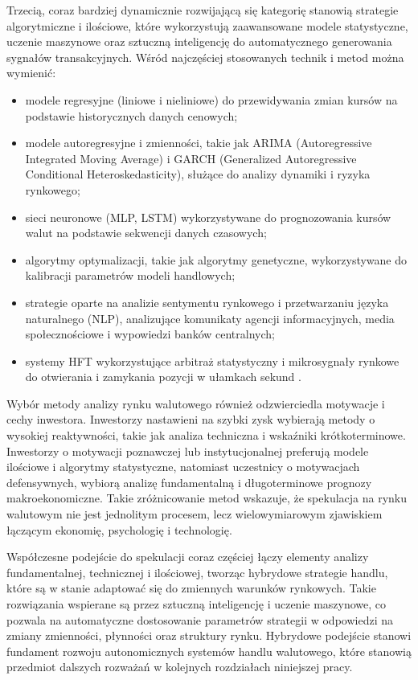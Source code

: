 Trzecią, coraz bardziej dynamicznie rozwijającą się kategorię stanowią strategie algorytmiczne i ilościowe, które wykorzystują zaawansowane modele statystyczne, uczenie maszynowe oraz sztuczną inteligencję do automatycznego generowania sygnałów transakcyjnych. Wśród najczęściej stosowanych technik i metod można wymienić:
\begin{itemize}
    \item modele regresyjne (liniowe i nieliniowe) do przewidywania zmian kursów na podstawie historycznych danych cenowych;
    \item modele autoregresyjne i zmienności, takie jak ARIMA (Autoregressive Integrated Moving Average) i GARCH (Generalized Autoregressive Conditional Heteroskedasticity), służące do analizy dynamiki i ryzyka rynkowego;
    \item sieci neuronowe (MLP, LSTM) wykorzystywane do prognozowania kursów walut na podstawie sekwencji danych czasowych;
    \item algorytmy optymalizacji, takie jak algorytmy genetyczne, wykorzystywane do kalibracji parametrów modeli handlowych;
    \item strategie oparte na analizie sentymentu rynkowego i przetwarzaniu języka naturalnego (NLP), analizujące komunikaty agencji informacyjnych, media społecznościowe i wypowiedzi banków centralnych;
    \item systemy HFT wykorzystujące arbitraż statystyczny i mikrosygnały rynkowe do otwierania i zamykania pozycji w ułamkach sekund \parencite{hull2018}.
\end{itemize}

Wybór metody analizy rynku walutowego również odzwierciedla motywacje i cechy inwestora. 
Inwestorzy nastawieni na szybki zysk wybierają metody o wysokiej reaktywności, takie jak analiza techniczna i wskaźniki krótkoterminowe. 
Inwestorzy o motywacji poznawczej lub instytucjonalnej preferują modele ilościowe i algorytmy statystyczne, natomiast uczestnicy o motywacjach defensywnych, 
wybiorą analizę fundamentalną i długoterminowe prognozy makroekonomiczne. 
Takie zróżnicowanie metod wskazuje, że spekulacja na rynku walutowym nie jest jednolitym procesem, lecz wielowymiarowym zjawiskiem łączącym ekonomię, psychologię i technologię.

Współczesne podejście do spekulacji coraz częściej łączy elementy analizy fundamentalnej, technicznej i ilościowej, 
tworząc hybrydowe strategie handlu, które są w stanie adaptować się do zmiennych warunków rynkowych. 
Takie rozwiązania wspierane są przez sztuczną inteligencję i uczenie maszynowe, co pozwala na automatyczne dostosowanie parametrów strategii w odpowiedzi na zmiany zmienności, 
płynności oraz struktury rynku. 
Hybrydowe podejście stanowi fundament rozwoju autonomicznych systemów handlu walutowego, które stanowią przedmiot dalszych rozważań w kolejnych rozdziałach niniejszej pracy.

